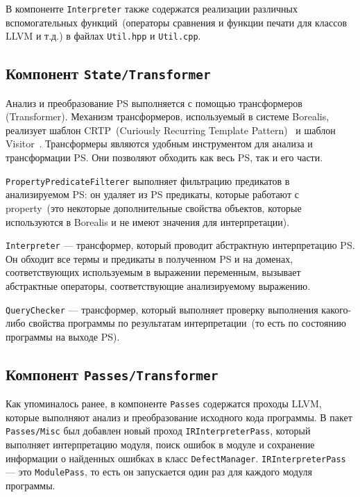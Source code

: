 В компоненте \texttt{Interpreter} также содержатся реализации различных 
вспомогательных функций~(операторы сравнения и функции печати для классов LLVM
и т.д.) в файлах \texttt{Util.hpp} и \texttt{Util.cpp}.

\subsection{Компонент \texttt{State/Transformer}}
Анализ и преобразование PS выполняется с помощью трансформеров (Transformer). 
Механизм трансформеров, используемый в системе Borealis, реализует шаблон 
CRTP~(Curiously Recurring Template Pattern)~\cite{crtp} и шаблон 
Visitor~\cite{visitor}. Трансформеры являются удобным инструментом для анализа 
и трансформации PS. Они позволяют обходить как весь PS, так и его части.

\texttt{PropertyPredicateFilterer} выполняет фильтрацию предикатов в 
анализируемом PS: он удаляет из PS предикаты, которые работают с property~(это
некоторые дополнительные свойства объектов, которые используются в Borealis и
не имеют значения для интерпретации).

\texttt{Interpreter} --- трансформер, который проводит абстрактную интерпретацию
PS. Он обходит все термы и предикаты в полученном PS и на доменах,
соответствующих используемым в выражении переменным, вызывает абстрактные 
операторы, соответствующие анализируемому выражению.

\texttt{QueryChecker} --- трансформер, который выполняет проверку выполнения
какого-либо свойства программы по результатам интерпретации~(то есть по 
состоянию программы на выходе PS).

\subsection{Компонент \texttt{Passes/Transformer}}
Как упоминалось ранее, в компоненте \texttt{Passes} содержатся проходы LLVM,
которые выполняют анализ и преобразование исходного кода программы. В пакет
\texttt{Passes/Misc} был добавлен новый проход
\texttt{IRInterpreterPass}, который выполняет интерпретацию модуля, поиск 
ошибок в модуле и сохранение информации о найденных ошибках в класс 
\texttt{DefectManager}. \texttt{IRInterpreterPass} --- это \texttt{ModulePass}, 
то есть он запускается один раз для каждого модуля программы.

